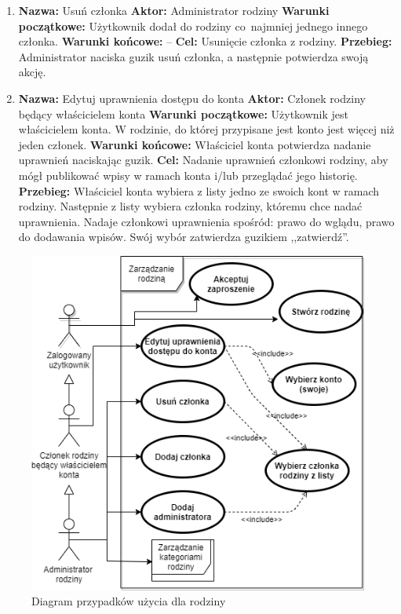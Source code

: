 \begin{enumerate}[labelwidth=1em,label=\arabic*.]
\item \textbf{Nazwa:} Usuń członka \newline
    \textbf{Aktor:} Administrator rodziny \newline
    \textbf{Warunki początkowe:} Użytkownik dodał do rodziny co~najmniej jednego innego członka. \newline
    \textbf{Warunki końcowe:} --  \newline
    \textbf{Cel:} Usunięcie członka z rodziny. \newline
    \textbf{Przebieg:} Administrator naciska guzik usuń członka, a następnie potwierdza swoją akcję.
\item \textbf{Nazwa:} Edytuj uprawnienia dostępu do konta \newline
    \textbf{Aktor:} Członek rodziny będący właścicielem konta \newline
    \textbf{Warunki początkowe:} Użytkownik jest właścicielem konta. W rodzinie, do której przypisane jest konto jest więcej niż jeden członek. \newline
    \textbf{Warunki końcowe:} Właściciel konta potwierdza nadanie uprawnień naciskając guzik. \newline
    \textbf{Cel:} Nadanie uprawnień członkowi rodziny, aby mógł publikować wpisy w ramach konta i/lub przeglądać jego historię.  \newline
    \textbf{Przebieg:} Właściciel konta wybiera z listy jedno ze swoich kont w ramach rodziny. Następnie z listy wybiera członka rodziny, któremu chce nadać uprawnienia. Nadaje członkowi uprawnienia spośród: prawo do wglądu, prawo do dodawania wpisów.
    Swój wybór zatwierdza guzikiem ,,zatwierdź''.
\end{enumerate}

\begin{figure}[t]
	\centering
	\includegraphics[width=.65\linewidth]{rys03/use-case-family.png}
	\caption{Diagram przypadków użycia dla rodziny}
	\label{fig:use-case-family}
\end{figure}

